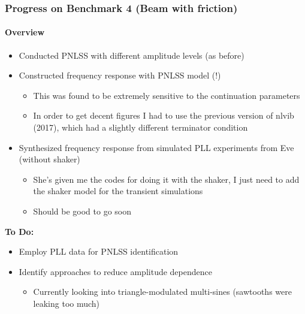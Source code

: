 \documentclass[aspectratio=169]{beamer}
\begin{document}
\begin{frame}
  \frametitle{Progress on Benchmark 4 (Beam with friction)}
  \framesubtitle{Overview}
  \begin{itemize}
  \item Conducted PNLSS with different amplitude levels (as before)
  \item Constructed frequency response with PNLSS model (!)
    \begin{itemize}
    \item This was found to be extremely sensitive to the continuation
      parameters
    \item In order to get decent figures I had to use the previous
      version of nlvib (2017), which had a slightly different
      terminator condition
    \end{itemize}
  \item Synthesized frequency response from simulated PLL experiments
    from Eve (without shaker)
    \begin{itemize}
    \item She's given me the codes for doing it with the shaker, I
      just need to add the shaker model for the transient simulations
    \item Should be good to go soon
    \end{itemize}
  \end{itemize}
  \textbf{To Do:}
  \begin{itemize}
  \item \alert{Employ PLL data for PNLSS identification}    
  \item Identify approaches to reduce amplitude dependence
    \begin{itemize}
    \item Currently looking into triangle-modulated multi-sines
      (sawtooths were leaking too much)
    \end{itemize}
  \end{itemize}
\end{frame}
\end{document}
